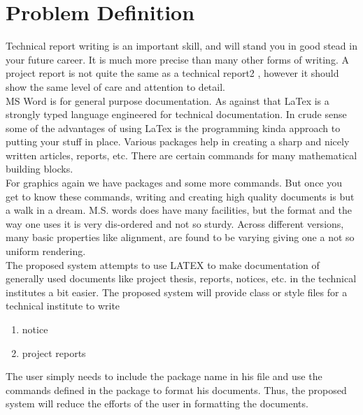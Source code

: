 \chapter{Problem Definition}

Technical report writing is an important skill, and will stand you in good stead in your future career. It is much more precise than many other forms of writing. A project report is not quite the same as a technical report2 , however it should show the same level of care and attention to detail. \\

MS Word is for general purpose documentation. As against that LaTex is a strongly typed language engineered for technical documentation. In crude sense some of the advantages of using LaTex is the programming kinda approach to putting your stuff in place. Various packages help in creating a sharp and nicely written articles, reports, etc. There are certain commands for many mathematical building blocks. \\

For graphics again we have packages and some more commands. But once you get to know these commands, writing and creating high quality documents is but a walk in a dream. M.S. words does have many facilities, but the format and the way one uses it is very dis-ordered and not so sturdy. Across different versions, many basic properties like alignment, are found to be varying giving one a not so uniform rendering. \\

The proposed system attempts to use LATEX to make documentation of generally used documents like project thesis, reports, notices, etc. in the technical institutes a bit easier. The proposed system will provide class or style files for a technical institute to write

\begin{enumerate}
    \item notice
    \item project reports
\end{enumerate}

The user simply needs to include the package name in his file and use the commands defined in the package to format his documents. Thus, the proposed system will reduce the efforts of the user in formatting the documents.